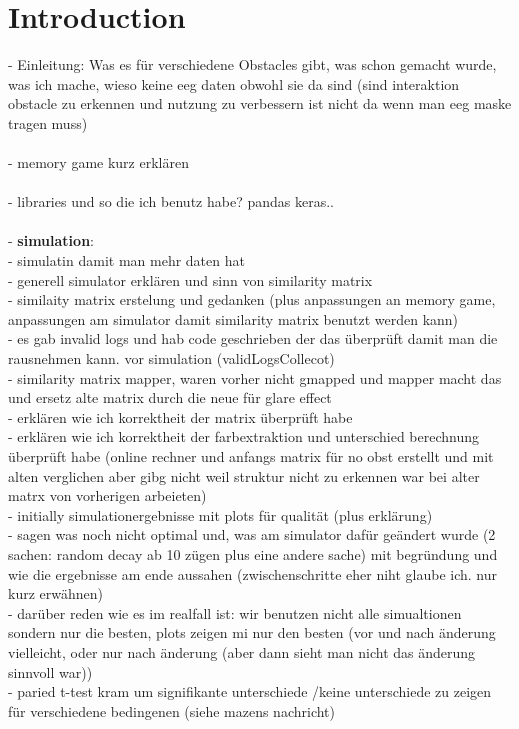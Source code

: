 
\chapter{Introduction}
\label{sec:intro}

\newpage

- Einleitung: Was es für verschiedene Obstacles gibt, was schon gemacht wurde, was ich mache, wieso keine eeg daten obwohl sie da sind (sind interaktion obstacle zu erkennen und nutzung zu verbessern ist nicht da wenn man eeg maske tragen muss)\\\\
- memory game kurz erklären\\\\
- libraries und so die ich benutz habe? pandas keras..\\\\

- \textbf{simulation}:\\
- simulatin damit man mehr daten hat\\
- generell simulator erklären und sinn von similarity matrix\\
- similaity matrix erstelung und gedanken (plus anpassungen an memory game, anpassungen am simulator damit similarity matrix benutzt werden kann)\\
- es gab invalid logs und hab code geschrieben der das überprüft damit man die rausnehmen kann. vor simulation (validLogsCollecot)\\
- similarity matrix mapper, waren vorher nicht gmapped und mapper macht das und ersetz alte matrix durch die neue für glare effect\\
- erklären wie ich korrektheit der matrix überprüft habe\\
- erklären wie ich korrektheit der farbextraktion und unterschied berechnung überprüft habe (online rechner und anfangs matrix für no obst erstellt und mit alten verglichen aber gibg nicht weil struktur nicht zu erkennen war bei alter matrx von vorherigen arbeieten)\\
- initially simulationergebnisse mit plots für qualität (plus erklärung)\\
- sagen was noch nicht optimal und, was am simulator dafür geändert wurde (2 sachen: random decay ab 10 zügen plus eine andere sache) mit begründung und wie die ergebnisse am ende aussahen (zwischenschritte eher niht glaube ich. nur kurz erwähnen)\\
- darüber reden wie es im realfall ist: wir benutzen nicht alle simualtionen sondern nur die besten, plots zeigen mi nur den besten (vor und nach änderung vielleicht, oder nur nach änderung (aber dann sieht man nicht das änderung sinnvoll war))\\
- paried t-test kram um signifikante unterschiede /keine unterschiede zu zeigen für verschiedene bedingenen (siehe mazens nachricht)\\\\

